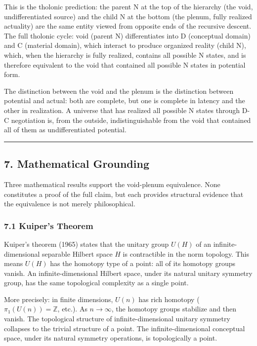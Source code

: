 \documentclass[
  11pt,
  letterpaper,
]{article}
\begin{document}
This is the tholonic prediction: the parent N at the top of the
hierarchy (the void, undifferentiated source) and the child N at the
bottom (the plenum, fully realized actuality) are the same entity viewed
from opposite ends of the recursive descent. The full tholonic cycle:
void (parent N) differentiates into D (conceptual domain) and C
(material domain), which interact to produce organized reality (child
N), which, when the hierarchy is fully realized, contains all possible N
states, and is therefore equivalent to the void that contained all
possible N states in potential form.

The distinction between the void and the plenum is the distinction
between potential and actual: both are complete, but one is complete in
latency and the other in realization. A universe that has realized all
possible N states through D-C negotiation is, from the outside,
indistinguishable from the void that contained all of them as
undifferentiated potential.

\begin{center}\rule{0.5\linewidth}{0.5pt}\end{center}

\subsection{7. Mathematical Grounding}\label{mathematical-grounding}

Three mathematical results support the void-plenum equivalence. None
constitutes a proof of the full claim, but each provides structural
evidence that the equivalence is not merely philosophical.

\subsubsection{7.1 Kuiper's Theorem}\label{kuipers-theorem}

Kuiper's theorem (1965) states that the unitary group \(U(H)\) of an
infinite-dimensional separable Hilbert space \(H\) is contractible in
the norm topology. This means \(U(H)\) has the homotopy type of a point:
all of its homotopy groups vanish. An infinite-dimensional Hilbert
space, under its natural unitary symmetry group, has the same
topological complexity as a single point.

More precisely: in finite dimensions, \(U(n)\) has rich homotopy
(\(\pi_1(U(n)) = \mathbb{Z}\), etc.). As \(n \to \infty\), the homotopy
groups stabilize and then vanish. The topological structure of
infinite-dimensional unitary symmetry collapses to the trivial structure
of a point. The infinite-dimensional conceptual space, under its natural
symmetry operations, is topologically a point.
\end{document}
